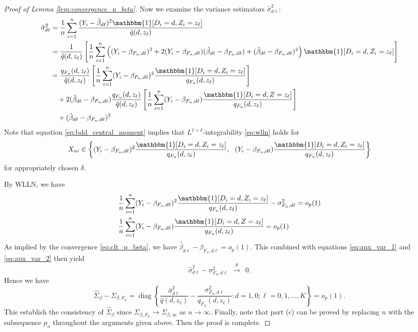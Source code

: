\documentclass[11pt]{article}
\theoremstyle{definition}
\DeclareMathOperator*{\diag}{diag}
\newcommand{\0}{\ensuremath{\mathbf{0}}}
\newcommand{\indicator}{\ensuremath{\mathbbm{1}}}
\begin{document}
\begin{bibunit}
\begin{proof}[Proof of Lemma \ref{lem:convergence_p_beta}]
	Now we examine the variance estimators $\hat{\sigma}_{d\ell}^2$:
	\begin{align*}
		\hat{\sigma}_{d\ell}^2 
		& = \frac{1}{n} \sum_{i=1}^n \frac{(Y_i - \hat{\beta}_{d\ell})^2\indicator[D_i=d, Z_i=z_\ell]}{\hat{q}(d,z_\ell)} \\
		& = \frac{1}{\hat{q}(d,z_\ell)} \left[\frac{1}{n}\sum_{i=1}^n \left((Y_i - \beta_{F_n, d\ell})^2 + 2(Y_i - \beta_{F_n,d\ell})(\hat{\beta}_{d\ell} - \beta_{F_n, d\ell}) + (\hat{\beta}_{d\ell} - \beta_{F_n, d\ell})^2 \right)\indicator[D_i =d, Z_i = z_\ell]\right] \\
		& = \frac{q_{F_n}(d,z_\ell)}{\hat{q}(d,z_\ell)} \left[ \frac{1}{n}\sum_{i=1}^n (Y_i - \beta_{F_n, d\ell})^2 \frac{\indicator[D_i = d, Z_i = z_\ell]}{q_{F_n}(d,z_\ell)}  \right] \\
		&\quad  + 2(\hat{\beta}_{d\ell} - \beta_{F_n, d\ell})\frac{q_{F_n}(d,z_\ell)}{\hat{q}(d,z_\ell)}\left[\frac{1}{n}\sum_{i=1}^n (Y_i - \beta_{F_n, d\ell})\frac{\indicator[D_i = d, Z = z_\ell]}{q_{F_n}(d,z_\ell)}\right] \\
		& \quad + (\hat{\beta}_{d\ell} - \beta_{F_n,d\ell})^2
	\end{align*}
	Note that equation \eqref{eq:bdd_central_moment} implies that $L^{1+\delta}$-integrability \eqref{eq:wlln} holds for 
	\[
		X_{ni} \in \left\{(Y_i - \beta_{F_n,d\ell})^2 \frac{\indicator[D_i=d, Z_i = z_\ell]}{q_{F_n}(d,z_\ell)}, ~~ (Y_i - \beta_{F_n, d\ell})\frac{\indicator[D_i=d, Z_i = z_\ell]}{q_{F_n}(d,z_\ell)}\right\}
	\]
for appropriately chosen $\delta$.

	By WLLN, we have
	\begin{equation}
	\label{eq:aux_var_2}
	\begin{aligned}
		& \frac{1}{n}\sum_{i=1}^n (Y_i - \beta_{F_n, d\ell})^2 \frac{\indicator[D_i = d, Z_i = z_\ell]}{q_{F_n}(d,z_\ell)}   - \sigma^2_{F_n, d\ell}  = o_p(1) \\
		& \frac{1}{n}\sum_{i=1}^n (Y_i - \beta_{F_n, d\ell})\frac{\indicator[D_i = d, Z = z_\ell]}{q_{F_n}(d,z_\ell)} = o_p(1) 
	\end{aligned}
	\end{equation}
	As implied by the convergence \eqref{eq:clt_p_beta}, we have $\hat{\beta}_{d\ell} - \beta_{F_n, d\ell} = o_p(1)$. This combined with equations \eqref{eq:aux_var_1} and \eqref{eq:aux_var_2} then yield 
	\[
		\hat{\sigma}_{d\ell}^2 - \sigma^2_{F_n, d\ell} ~~\xrightarrow{p}~~ 0.
	\]
	Hence we have 
	\[
		\hat{\Sigma}_{\beta} - \Sigma_{\beta,F_n} = \diag\left\{\frac{\hat{\sigma}_{d\ell}^2}{\hat{q}(d,z_\ell)} - \frac{\sigma_{F_n, d\ell}^2}{q_{F_n}(d,z_\ell)}: d=1,0; \ell = 0,1,\ldots,K\right\} = o_p(1).
	\]
	This establish the consistency of $\hat{\Sigma}_{\beta}$ since $\Sigma_{\beta,F_n} \to \Sigma_{\beta,\infty}$ as $n \to \infty$. Finally, note that part (c) can be proved by replacing $n$ with the subsequence $p_n$ throughout the arguments given above. Then the proof is complete.
\end{proof}



\end{bibunit}
\end{document}
